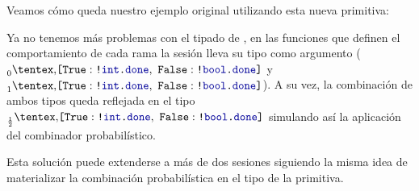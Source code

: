 Veamos cómo queda nuestro ejemplo original utilizando esta nueva primitiva:

\TwoSessionsPickTwo

Ya no tenemos más problemas con el tipado de , en las funciones que
definen el comportamiento de cada rama la sesión lleva su tipo como argumento
($\BinaryPChoice[0]{\Out\tint\Done}{\Out\tbool\Done}$ y
$\BinaryPChoice[1]{\Out\tint\Done}{\Out\tbool\Done}$). A su vez, la combinación
de ambos tipos queda reflejada en el tipo
$\BinaryPChoice[\frac{1}{2}]{\Out\tint\Done}{\Out\tbool\Done}$ simulando así la
aplicación del combinador probabilístico.

Esta solución puede extenderse a más de dos sesiones siguiendo la misma idea de
materializar la combinación probabilística en el tipo de la primitiva.
